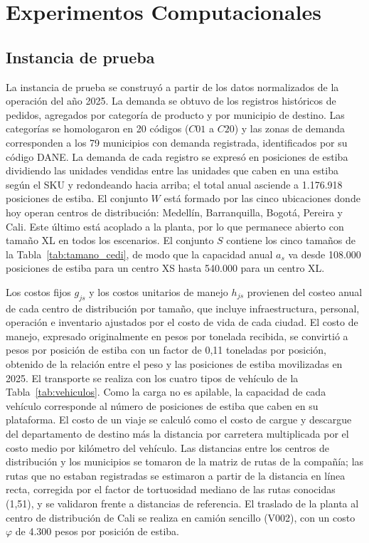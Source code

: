\documentclass[fleqn, 11pt,letterpaper]{article}
\begin{document}
\section{Experimentos Computacionales}

\subsection{Instancia de prueba}
La instancia de prueba se construyó a partir de los datos normalizados de la operación del año 2025. La demanda se obtuvo de los registros históricos de pedidos, agregados por categoría de producto y por municipio de destino. Las categorías se homologaron en 20 códigos ($C01$ a $C20$) y las zonas de demanda corresponden a los 79 municipios con demanda registrada, identificados por su código DANE. La demanda de cada registro se expresó en posiciones de estiba dividiendo las unidades vendidas entre las unidades que caben en una estiba según el SKU y redondeando hacia arriba; el total anual asciende a 1.176.918 posiciones de estiba. El conjunto $W$ está formado por las cinco ubicaciones donde hoy operan centros de distribución: Medellín, Barranquilla, Bogotá, Pereira y Cali. Este último está acoplado a la planta, por lo que permanece abierto con tamaño XL en todos los escenarios. El conjunto $S$ contiene los cinco tamaños de la Tabla~\ref{tab:tamano_cedi}, de modo que la capacidad anual $a_s$ va desde 108.000 posiciones de estiba para un centro XS hasta 540.000 para un centro XL.

Los costos fijos $g_{js}$ y los costos unitarios de manejo $h_{js}$ provienen del costeo anual de cada centro de distribución por tamaño, que incluye infraestructura, personal, operación e inventario ajustados por el costo de vida de cada ciudad. El costo de manejo, expresado originalmente en pesos por tonelada recibida, se convirtió a pesos por posición de estiba con un factor de 0,11 toneladas por posición, obtenido de la relación entre el peso y las posiciones de estiba movilizadas en 2025. El transporte se realiza con los cuatro tipos de vehículo de la Tabla~\ref{tab:vehiculos}. Como la carga no es apilable, la capacidad de cada vehículo corresponde al número de posiciones de estiba que caben en su plataforma. El costo de un viaje se calculó como el costo de cargue y descargue del departamento de destino más la distancia por carretera multiplicada por el costo medio por kilómetro del vehículo. Las distancias entre los centros de distribución y los municipios se tomaron de la matriz de rutas de la compañía; las rutas que no estaban registradas se estimaron a partir de la distancia en línea recta, corregida por el factor de tortuosidad mediano de las rutas conocidas (1,51), y se validaron frente a distancias de referencia. El traslado de la planta al centro de distribución de Cali se realiza en camión sencillo (V002), con un costo $\varphi$ de 4.300 pesos por posición de estiba.
\end{document}
